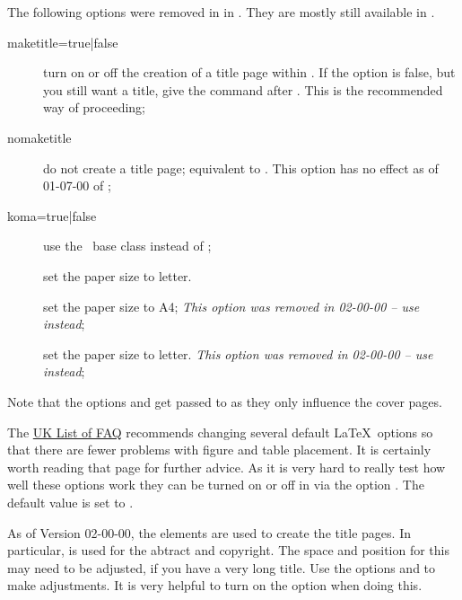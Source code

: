 The following options were removed in  in .
They are mostly still available in .
\begin{description}
\item[maketitle={\normalfont true}|false] turn on or off the creation of a title page within .
  If the option is false, but you still want a title, give the command  after
  \verb||.
  This is the recommended way of proceeding;
\item[nomaketitle] do not create a title page; equivalent to .
  This option has no effect as of  01-07-00 of ;
\item[koma=true|{\normalfont false}] use the \KOMAScript\ base class  instead of ;
\item[] set the paper size to letter.
\item[] set the paper size to A4;
  \emph{This option was removed in  02-00-00
  -- use  instead};
\item[] set the paper size to letter.
  \emph{This option was removed in  02-00-00
  -- use  instead};
\end{description}
Note that the options  and  get passed to 
as they only influence the cover pages.

The
\href{http://www.tex.ac.uk/cgi-bin/texfaq2html?label=floats}{UK List of FAQ}
recommends changing several default \LaTeX\ options so that there are fewer problems
with figure and table placement.
It is certainly worth reading that page for further advice.
As it is very hard to really test how well these options work
they can be turned on or off in  via the option .
The default value is set to .

As of  Version 02-00-00,
the \KOMAScript elements are used to create the title pages.
In particular,  is used for the abtract and copyright.
The space and position for this may need to be adjusted,
if you have a very long title. Use the options
 and  to make adjustments.
It is very helpful to turn on the  option when doing this.


